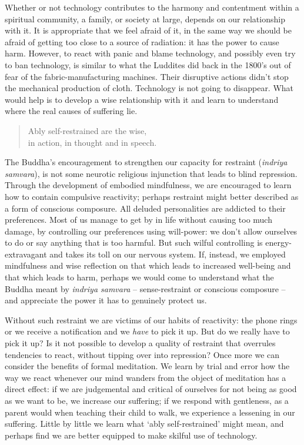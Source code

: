 Whether or not technology contributes to the harmony and contentment
within a spiritual community, a family, or society at large, depends on
our relationship with it. It is appropriate that we feel afraid of it,
in the same way we should be afraid of getting too close to a source of
radiation: it has the power to cause harm. However, to react with panic
and blame technology, and possibly even try to ban technology, is
similar to what the Luddites\cite{luddites}
did back in the 1800's out of fear of the fabric-manufacturing
machines. Their disruptive actions didn't stop the mechanical production
of cloth. Technology is not going to disappear. What would help is to
develop a wise relationship with it and learn to understand where the
real causes of suffering lie.

\begin{quote}
  Ably self-restrained are the wise,\\
  in action, in thought and in speech.

\end{quote}

The Buddha's encouragement to strengthen our capacity for restraint
(\emph{indriya samvara}), is not some neurotic religious injunction that
leads to blind repression. Through the development of embodied
mindfulness, we are encouraged to learn how to contain compulsive
reactivity; \mbox{perhaps} restraint might better described as a form of
conscious composure. All deluded personalities are addicted to their
preferences. Most of us manage to get by in life without causing too
much damage, by controlling our preferences using will-power: we don't
allow ourselves to do or say anything that is too harmful. But such
wilful controlling is energy-extravagant and takes its toll on our
nervous system. If, instead, we employed mindfulness and wise reflection
on that which leads to increased well-being and that which leads to
harm, perhaps we would come to understand what the Buddha meant by
\emph{indriya samvara} -- sense-restraint or conscious composure -- and
appreciate the power it has to genuinely protect us.

Without such restraint we are victims of our habits of reactivity: the
phone rings or we receive a notification and we \emph{have} to pick it
up. But do we really have to pick it up? Is it not possible to develop a
quality of restraint that overrules tendencies to react, without tipping
over into repression? Once more we can consider the benefits of formal
meditation. We learn by trial and error how the way we react whenever
our mind wanders from the object of meditation has a direct effect: if
we are judgemental and critical of ourselves for not being as good as we
want to be, we increase our suffering; if we respond with gentleness, as
a parent would when teaching their child to walk, we experience a
lessening in our suffering. Little by little we learn what `ably
self-restrained' might mean, and perhaps find we are better equipped to make
skilful use of technology.

